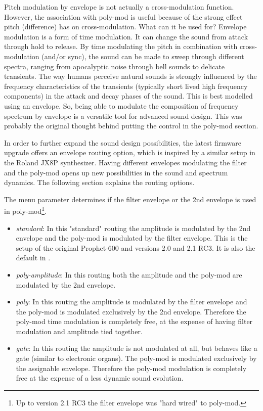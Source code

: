 Pitch modulation by envelope is not actually a cross-modulation function. However, the association with poly-mod is useful because of the strong effect pitch (difference) has on cross-modulation. What can it be used for? Envelope modulation is a form of time modulation. It can change the sound from attack through hold to release. By time modulating the pitch in combination with cross-modulation (and/or sync), the sound can be made to sweep through different spectra, ranging from apocalyptic noise through bell sounds to delicate transients. The way humans perceive natural sounds is strongly influenced by the frequency characteristics of the transients (typically short lived high frequency components) in the attack and decay phases of the sound. This is best modelled using an envelope. So, being able to modulate the composition of frequency spectrum by envelope is a versatile tool for advanced sound design. This was probably the original thought behind putting the \polymodenv control in the poly-mod section.

In order to further expand the sound design possibilities, the latest firmware upgrade offers an envelope routing option, which is inspired by a similar setup in the Roland JX8P synthesizer. Having different envelopes modulating the filter and the poly-mod opens up new possibilities in the sound and spectrum dynamics. The following section explains the routing options. 

The menu parameter \envrouting determines if the filter envelope or the 2nd envelope is used in poly-mod\footnote{Up to version 2.1 RC3 the filter envelope was "hard wired" to poly-mod.}.

\begin{itemize}
  \setlength\itemsep{0cm}
  \item \textit{standard}: In this "standard" routing the amplitude is modulated by the 2nd envelope and the poly-mod is modulated by the filter envelope. This is the setup of the original Prophet-600 and versions 2.0 and 2.1 RC3. It is also the default in \version.
  \item \textit{poly-amplitude}: In this routing both the amplitude and the poly-mod are modulated by the 2nd envelope. 
  \item \textit{poly}: In this routing the amplitude is modulated by the filter envelope and the poly-mod is modulated exclusively by the 2nd envelope. Therefore the poly-mod time modulation is completely free, at the expense of having filter modulation and amplitude tied together.
  \item \textit{gate}: In this routing the amplitude is not modulated at all, but behaves like a gate (similar to electronic organs). The poly-mod is modulated exclusively by the assignable envelope. Therefore the poly-mod modulation is completely free at the expense of a less dynamic sound evolution.
\end{itemize}  

